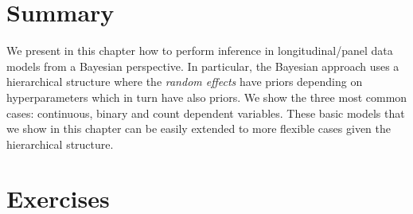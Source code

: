 \section{Summary}\label{sec94}
We present in this chapter how to perform inference in longitudinal/panel data models from a Bayesian perspective. In particular, the Bayesian approach uses a hierarchical structure where the \textit{random effects} have priors depending on hyperparameters which in turn have also priors. We show the three most common cases: continuous, binary and count dependent variables. These basic models that we show in this chapter can be easily extended to more flexible cases given the hierarchical structure. 

\section{Exercises}\label{sec95}

